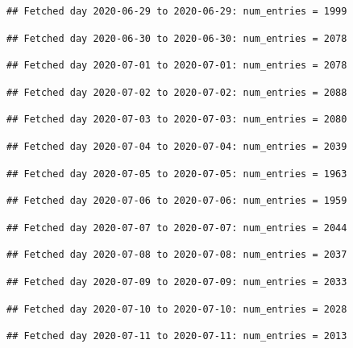 \documentclass[]{article}
\begin{document}
\begin{verbatim}
## Fetched day 2020-06-29 to 2020-06-29: num_entries = 1999
\end{verbatim}

\begin{verbatim}
## Fetched day 2020-06-30 to 2020-06-30: num_entries = 2078
\end{verbatim}

\begin{verbatim}
## Fetched day 2020-07-01 to 2020-07-01: num_entries = 2078
\end{verbatim}

\begin{verbatim}
## Fetched day 2020-07-02 to 2020-07-02: num_entries = 2088
\end{verbatim}

\begin{verbatim}
## Fetched day 2020-07-03 to 2020-07-03: num_entries = 2080
\end{verbatim}

\begin{verbatim}
## Fetched day 2020-07-04 to 2020-07-04: num_entries = 2039
\end{verbatim}

\begin{verbatim}
## Fetched day 2020-07-05 to 2020-07-05: num_entries = 1963
\end{verbatim}

\begin{verbatim}
## Fetched day 2020-07-06 to 2020-07-06: num_entries = 1959
\end{verbatim}

\begin{verbatim}
## Fetched day 2020-07-07 to 2020-07-07: num_entries = 2044
\end{verbatim}

\begin{verbatim}
## Fetched day 2020-07-08 to 2020-07-08: num_entries = 2037
\end{verbatim}

\begin{verbatim}
## Fetched day 2020-07-09 to 2020-07-09: num_entries = 2033
\end{verbatim}

\begin{verbatim}
## Fetched day 2020-07-10 to 2020-07-10: num_entries = 2028
\end{verbatim}

\begin{verbatim}
## Fetched day 2020-07-11 to 2020-07-11: num_entries = 2013
\end{verbatim}
\end{document}
